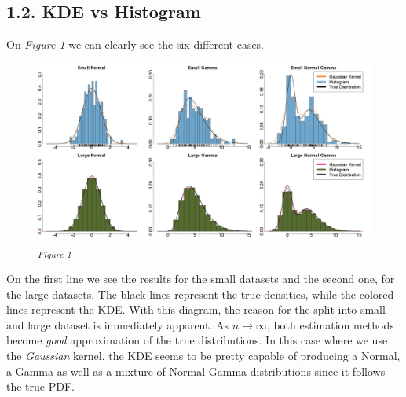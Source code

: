 \documentclass[fleqn, a4paper]{report}
\begin{document}
\subsection*{1.2. KDE vs Histogram}
On \textit{Figure 1} we can clearly see the six different cases. 
\begin{figure}[!ht]
\includegraphics[width=1\textwidth]{./images/hist_vs_GKDE.jpg}
\textsubscript{\textit{Figure 1}}
\label{tab:fig_1}
\end{figure}
On the first line we see the results for the small datasets and the second one, for the large datasets. The black lines represent the true densities, while the colored lines represent the KDE. With this diagram, the reason for the split into small and large dataset is immediately apparent. As $n \rightarrow \infty$, both estimation methods become \textit{good} approximation of the true distributions. In this case where we use the \textit{Gaussian} kernel, the KDE seems to be  pretty capable of producing a Normal, a Gamma as well as a mixture of Normal Gamma distributions since it follows the true PDF. 
\end{document}
